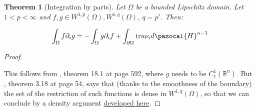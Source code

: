 \documentclass[english,a4paper,12pt,oneside]{scrbook}
\theoremstyle{break}
\newtheorem{thm}[equation]{Theorem}
\newenvironment{mproof}[1][\proofname]{%
  \begin{proof}[#1]$ $\par\nobreak\ignorespaces
}{%
  \end{proof}
}
\renewcommand*{\proofname}{Proof}
\theoremstyle{remark}
\newcommand{\mR}{\mathbb{R}}
\newcommand{\tr}{\text{tr}}
\begin{document}
\begin{thm}[Integration by parts]
\label{thm:ibp}
Let $\Omega$ be a bounded Lipschitz domain. Let $1<p<\infty$ and $f,g \in W^{1,p}(\Omega), W^{1,q}(\Omega)$, $q=p'$. Then:

$$\int_\Omega f \partial_i g = -\int_\Omega g \partial_i f+\int_{\partial \Omega} \tr u \nu_i d\pazocal{H}^{n-1}$$
\end{thm}
\begin{mproof}

This follows from \cite{leoni}, theorem 18.1 at page 592, where $g$ needs to be $C^1_c(\mR^n)$. But \cite{adams}, theorem 3.18 at page 54, says that (thanks to the smoothness of the boundary) the set of the restriction of such functions is dense in $W^{1,q}(\Omega)$, so that we can conclude by a density argument \textcolor{red}{\href{https://www.math.kit.edu/iana2/lehre/sobolevspaces2021s/media/lec15.pdf}{developed here}}.

\end{mproof}
\end{document}
